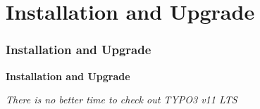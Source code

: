 %

\section{Installation and Upgrade}
\begin{frame}[fragile]
	\frametitle{Installation and Upgrade}

	\begin{center}\huge{\color{typo3darkgrey}\textbf{Installation and Upgrade}}\end{center}
	\begin{center}\large{\textit{There is no better time to check out TYPO3 v11 LTS}}\end{center}

\end{frame}

